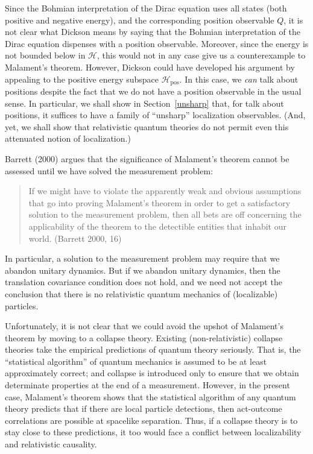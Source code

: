 \documentclass[11pt]{article}
\theoremstyle{remark}
\newcommand{\hil}[1]{\mathcal{#1}}
\begin{document}
Since the Bohmian interpretation of the Dirac equation uses all states
(both positive and negative energy), and the corresponding position
observable $Q$, it is not clear what Dickson means by saying that the
Bohmian interpretation of the Dirac equation dispenses with a position
observable.  Moreover, since the energy is not bounded below in
$\hil{H}$, this would not in any case give us a counterexample to
Malament's theorem.  However, Dickson could have developed his
argument by appealing to the positive energy subspace
$\hil{H}_{\mathrm{pos}}$.  In this case, we \emph{can} talk about
positions despite the fact that we do not have a position observable
in the usual sense.  In particular, we shall show in
Section~\ref{unsharp} that, for talk about positions, it suffices to
have a family of ``unsharp'' localization observables.  (And, yet, we
shall show that relativistic quantum theories do not permit even this
attenuated notion of localization.)

Barrett (2000) argues that the significance of Malament's theorem
cannot be assessed until we have solved the measurement problem:
\begin{quote} If we might have to violate
  the apparently weak and obvious assumptions that go into proving
  Malament's theorem in order to get a satisfactory solution to the
  measurement problem, then all bets are off concerning the
  applicability of the theorem to the detectible entities that inhabit
  our world.  (Barrett 2000, 16) \end{quote} In particular, a solution
to the measurement problem may require that we abandon unitary
dynamics.  But if we abandon unitary dynamics, then the translation
covariance condition does not hold, and we need not accept the
conclusion that there is no relativistic quantum mechanics of
(localizable) particles.

Unfortunately, it is not clear that we could avoid the upshot of
Malament's theorem by moving to a collapse theory.  Existing
(non-relativistic) collapse theories take the empirical predictions of
quantum theory seriously.  That is, the ``statistical algorithm'' of
quantum mechanics is assumed to be at least approximately correct; and
collapse is introduced only to ensure that we obtain determinate
properties at the end of a measurement.  However, in the present case,
Malament's theorem shows that the statistical algorithm of any quantum
theory predicts that if there are local particle detections, then
act-outcome correlations are possible at spacelike separation.  Thus,
if a collapse theory is to stay close to these predictions, it too
would face a conflict between localizability and relativistic
causality.
\end{document}
